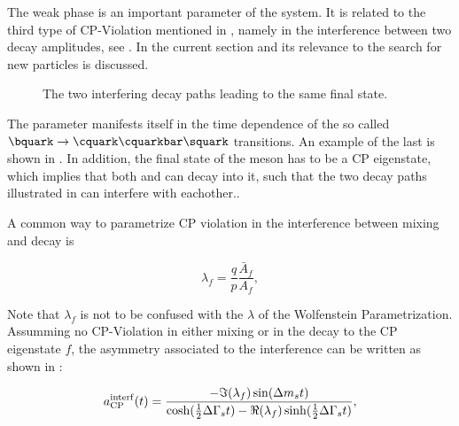 The weak phase \phis is an important parameter of the \BBbarSyst system. It is related to the third
type of CP-Violation mentioned in , namely in the interference between
two decay amplitudes, see . In the current section \phis and its relevance to
the search for new particles is discussed.

\newcommand{\ffig}{f}
\newcommand{\phimixfig}{\phi_\text{mix}}
\newcommand{\phifig}{\phi_\text{dec}}
\newcommand{\phibarfig}{\kern 0.15em \overline{\kern -0.15em \phi_\text{dec} \kern -0.60em} \kern 0.60em}
\begin{figure}[h]
  \centering
  \resizebox{0.4\textwidth}{!}{}
  \caption{The two interfering decay paths leading to the same final state.}
  \label{interference}
\end{figure}

The parameter \phis manifests itself in the time dependence of the so called $\bquark \rightarrow \cquark\cquarkbar\squark $ transitions.
An example of the last is shown in . In addition, the final state of the \Bs meson has to be
a CP eigenstate, which implies that both \Bs and \Bsb can decay into it, such that the two decay paths
illustrated in  can interfere with eachother..

A common way to parametrize CP violation in the interference between mixing and decay is

\begin{equation}
 \lambda_{f} = \frac{q}{p} \frac{\bar{A}_f}{A_f}, %
\label{lambda_cpv}
\end{equation}

\noindent Note that $\lambda_f$ is not to be confused with the $\lambda$ of the Wolfenstein Parametrization.
Assumming no CP-Violation in either \BBbarSyst mixing or in the decay to the CP eigenstate $f$, the asymmetry
associated to the interference can be written as shown in :


\newcommand{\half}{\frac{1}{2}}
\begin{equation}
  a_{\rm CP}^{\rm interf}(t) = \frac{ - \Im(\lambda_f) \sin(\Delta m_s t)} {\cosh(\half \Delta\Gamma_s t) - \Re(\lambda_f)\sinh(\half\Delta\Gamma_s t)},
\label{cpv_interf}
\end{equation}

